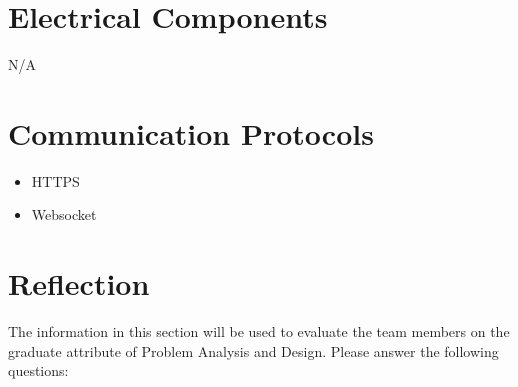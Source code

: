 \documentclass[12pt, titlepage]{article}
\begin{document}
\section{Electrical Components}
N/A
\section{Communication Protocols}
\begin{itemize}
    \item HTTPS
    \item Websocket
\end{itemize}

\section{Reflection}

The information in this section will be used to evaluate the team members on the
graduate attribute of Problem Analysis and Design.  Please answer the following questions:
\end{document}
